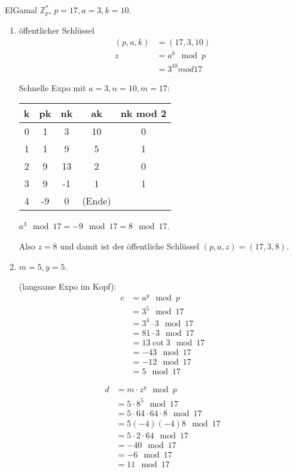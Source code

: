 ElGamal $\mathbb{Z}_{p}^{\ast}$, $p = 17, a = 3, k = 10$.

\begin{enumerate}[label=\alph*)]
\item öffentlicher Schlüssel
\begin{align*}
( p, a, k ) &= ( 17, 3, 10 ) \\
z &= a^{k} \mod p \\
&= 3^{10} mod 17
\end{align*}

Schnelle Expo mit $a = 3, n = 10, m = 17$:

\begin{tabular}{c|c|c|c|c}
k & pk & nk & ak & nk mod 2 \\
\hline
0 & 1 & 3 & 10 & 0 \\
1 & 1 & 9 & 5 & 1 \\
2 & 9 & 13 & 2 & 0 \\
3 & 9 & -1 & 1 & 1 \\
4 & -9 & 0 & (Ende)
\end{tabular}

$a^{3} \mod 17 = -9 \mod 17 = 8 \mod 17$.

Also $z = 8$ und damit ist der öffentliche Schlüssel $( p, a, z ) = (17, 3, 8)$.
\item $m = 5, y = 5$.

(langsame Expo im Kopf):
\begin{align*}
c &= a^{y} \mod p \\
&= 3^{5} \mod 17 \\
&= 3^{4}\cdot3 \mod 17 \\
&= 81\cdot 3 \mod 17 \\
&= 13\cot 3 \mod 17 \\
&= -43 \mod 17 \\
&= -12 \mod 17 \\
&= 5 \mod 17
\end{align*}

\begin{align*}
d &= m\cdot z^{y} \mod p \\
&= 5\cdot 8^{5} \mod 17 \\
&= 5\cdot 64 \cdot 64 \cdot 8 \mod 17 \\
&= 5(-4)(-4)8 \mod 17 \\
&= 5\cdot 2 \cdot 64 \mod 17 \\
&= -40 \mod 17 \\
&= -6 \mod 17 \\
&= 11 \mod 17
\end{align*}


\end{enumerate}
